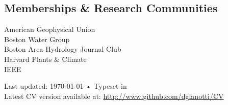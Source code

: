 \documentclass[10pt, a4paper]{article}
\begin{document}
\subsection*{Memberships \& Research Communities}
American Geophysical Union\\ %
Boston Water Group\\ %
Boston Area Hydrology Journal Club\\ %
Harvard Plants \& Climate\\
IEEE


\vfill{}

\begin{center}
{\scriptsize  Last updated: \today\- •\- 
Typeset in \href{http://nitens.org/taraborelli/cvtex}{
\XeTeX }\\
Latest CV version available at: \href{http://www.github.com/dgianotti/CV}{http://www.github.com/dgianotti/CV}}
\end{center}
\end{document}
